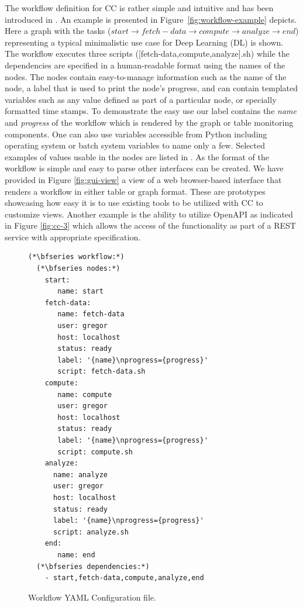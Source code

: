 \documentclass[utf8]{FrontiersinVancouver} %
\begin{document}
The workflow definition for CC is rather simple and
intuitive and has been introduced in \cite{las-2022-templated}. An example is presented in  Figure~\ref{fig:workflow-example} depicts. Here a graph
with the tasks ($start \rightarrow f\!etch\!-\!data
\rightarrow compute \rightarrow analyze \rightarrow end$) representing a typical minimalistic use case for Deep Learning (DL) is shown. The workflow
 executes three scripts ([fetch-data,compute,analyze].sh) while the dependencies are specified in a human-readable format using the names of the nodes. The nodes contain easy-to-manage information such as the name of the node, a label that is used to print the node's progress, and can contain templated variables such as any value defined as part of a particular node, or specially formatted time stamps. To demonstrate the easy use our label contains the {\em name} and {\em progress} of the workflow which is rendered by the graph or table monitoring components. One can also use variables accessible from Python including operating system or batch system variables to name only a few. Selected examples of values usable in the nodes are listed in \citep{las-2022-templated}.
As the format of the workflow is simple and easy to parse other interfaces can be created. We have provided in Figure \ref{fig:gui-view} a view of a web browser-based interface that renders a workflow in either table or graph format. These are prototypes showcasing how easy it is to use existing tools to be utilized with CC to customize views. Another example is the ability to utilize OpenAPI as indicated in 
Figure \ref{fig:cc-3}  which allows the access of the functionality as part of a REST service with appropriate specification. 


\begin{figure}[htb]
\vspace{-0.4cm} 
\begin{lstlisting}[breaklines=true]
(*\bfseries workflow:*)
  (*\bfseries nodes:*)
    start:
       name: start
    fetch-data:
       name: fetch-data
       user: gregor
       host: localhost
       status: ready
       label: '{name}\nprogress={progress}'
       script: fetch-data.sh
    compute:
       name: compute
       user: gregor
       host: localhost
       status: ready
       label: '{name}\nprogress={progress}'
       script: compute.sh
    analyze:
      name: analyze
      user: gregor
      host: localhost
      status: ready
      label: '{name}\nprogress={progress}'
      script: analyze.sh
    end:
       name: end
  (*\bfseries dependencies:*)
    - start,fetch-data,compute,analyze,end
\end{lstlisting}
\vspace{-0.4cm}
\caption{Workflow YAML Configuration file.}\label{fig:workflow-example}
\label{fig:yaml-file}
\end{figure}
\end{document}
